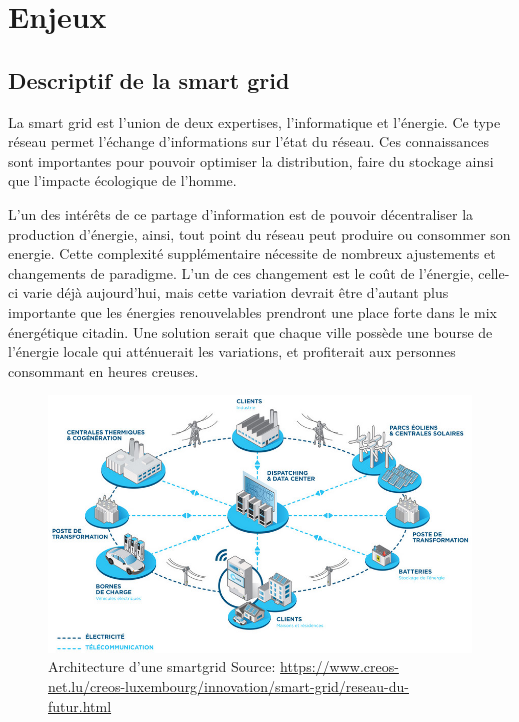 \chapter{Enjeux}
\section{Descriptif de la smart grid}


La smart grid est l'union de deux expertises, l'informatique et l'énergie.
Ce type réseau permet l'échange d'informations sur l'état du réseau.
Ces connaissances sont importantes pour pouvoir optimiser la distribution, faire du stockage
ainsi que l'impacte écologique de l'homme.

L'un des intérêts de ce partage d'information est de pouvoir décentraliser la production d'énergie,
ainsi, tout point du réseau peut produire ou consommer son energie.
Cette complexité supplémentaire nécessite de nombreux ajustements et changements de paradigme.
L'un de ces changement est le coût de l'énergie, celle-ci varie déjà aujourd’hui, mais cette variation
devrait être d'autant plus importante que les énergies renouvelables prendront une place forte dans
le mix énergétique citadin. Une solution serait que chaque ville possède une bourse de l'énergie
locale qui atténuerait les variations, et profiterait aux personnes consommant en heures creuses.

\begin{figure}
    \centering
    \includegraphics[scale=0.25]{media/smart_city_lux.jpg}
    \caption{
        Architecture d'une smartgrid\newline
        \tiny{Source: \url{https://www.creos-net.lu/creos-luxembourg/innovation/smart-grid/reseau-du-futur.html}}
    }
\end{figure}

